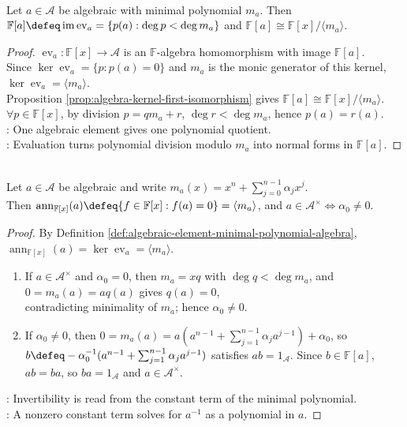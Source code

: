 \begin{proposition} \label{prop:generated-algebra-by-one-algebraic-element} \\
Let $a\in\mathcal{A}$ be algebraic with minimal polynomial $m_a$. Then $\mathbb{F}[a]\defeq\operatorname{im}\operatorname{ev}_a=\{p(a):\deg p<\deg m_a\}$ and $\mathbb{F}[a]\cong\mathbb{F}[x]/\langle m_a\rangle$.
\begin{proof}
$\operatorname{ev}_a:\mathbb{F}[x]\to\mathcal{A}$ is an $\mathbb{F}$-algebra homomorphism with image $\mathbb{F}[a]$.\\
Since $\ker\operatorname{ev}_a=\{p:p(a)=0\}$ and $m_a$ is the monic generator of this kernel, $\ker\operatorname{ev}_a=\langle m_a\rangle$.\\
Proposition \ref{prop:algebra-kernel-first-isomorphism} gives $\mathbb{F}[a]\cong\mathbb{F}[x]/\langle m_a\rangle$. $\forall p\in\mathbb{F}[x]$, by division $p=qm_a+r$, $\deg r<\deg m_a$, hence $p(a)=r(a)$.\\
: One algebraic element gives one polynomial quotient.\\
: Evaluation turns polynomial division modulo $m_a$ into normal forms in $\mathbb{F}[a]$.
\end{proof}
\end{proposition}

\begin{theorem} \label{thm:algebraic-element-annihilator-and-invertibility} \\
Let $a\in\mathcal{A}$ be algebraic and write $m_a(x)=x^n+\sum_{j=0}^{n-1}\alpha_jx^j$.\\
Then $\operatorname{ann}_{\mathbb{F}[x]}(a)\defeq\{f\in\mathbb{F}[x]:f(a)=0\}=\langle m_a\rangle$, and $a\in\mathcal{A}^{\times}\Longleftrightarrow\alpha_0\neq0$.
\begin{proof} By Definition \ref{def:algebraic-element-minimal-polynomial-algebra}, $\operatorname{ann}_{\mathbb{F}[x]}(a)=\ker\operatorname{ev}_a=\langle m_a\rangle$.
\begin{enumerate}[label=\roman*.]
\setlength{\itemsep}{0pt}
\item[$(\Rightarrow)$] If $a\in\mathcal{A}^{\times}$ and $\alpha_0=0$, then $m_a=xq$ with $\deg q<\deg m_a$, and $0=m_a(a)=aq(a)$ gives $q(a)=0$,\\
contradicting minimality of $m_a$; hence $\alpha_0\neq0$.
\item[$(\Leftarrow)$] If $\alpha_0\neq0$, then $0=m_a(a)=a(a^{n-1}+\sum_{j=1}^{n-1}\alpha_ja^{j-1})+\alpha_0$, so $b\defeq-\alpha_0^{-1}(a^{n-1}+\sum_{j=1}^{n-1}\alpha_ja^{j-1})$ satisfies $ab=1_{\mathcal{A}}$. Since $b\in\mathbb{F}[a]$, $ab=ba$, so $ba=1_{\mathcal{A}}$ and $a\in\mathcal{A}^{\times}$.
\end{enumerate}
: Invertibility is read from the constant term of the minimal polynomial.\\
: A nonzero constant term solves for $a^{-1}$ as a polynomial in $a$.
\end{proof}
\end{theorem}
